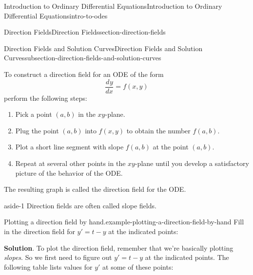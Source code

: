 \documentclass[oneside,10pt,]{book}
\numberwithin{equation}{section}
\newcommand{\dv}[3][]{\dfrac{d^{#1} #2}{d #3^{#1}}}
\begin{document}
\begin{chapterptx}{Introduction to Ordinary Differential Equations}{}{Introduction to Ordinary Differential Equations}{}{}{intro-to-odes}
\begin{sectionptx}{Direction Fields}{}{Direction Fields}{}{}{section-direction-fields}
\begin{subsectionptx}{Direction Fields and Solution Curves}{}{Direction Fields and Solution Curves}{}{}{subsection-direction-fields-and-solution-curves}
\par
\hypertarget{p-39}{}%
To construct a direction field for an ODE of the form%
\begin{equation*}
\dv{y}{x} = f(x,y)
\end{equation*}
perform the following steps:\leavevmode%
\begin{enumerate}
\item\hypertarget{li-5}{}Pick a point \((a,b)\) in the \(xy\)-plane.%
\item\hypertarget{li-6}{}Plug the point \((a,b)\) into \(f(x,y)\) to obtain the number \(f(a,b)\).%
\item\hypertarget{li-7}{}Plot a short line segment with slope \(f(a,b)\) at the point \((a,b)\).%
\item\hypertarget{li-8}{}Repeat at several other points in the \(xy\)-plane until you develop a satisfactory picture of the behavior of the ODE.%
\end{enumerate}
The resulting graph is called the direction field for the ODE.%
\begin{aside}{}{aside-1}%
\hypertarget{p-40}{}%
Direction fields are often called slope fields.%
\end{aside}
\begin{example}{Plotting a direction field by hand.}{example-plotting-a-direction-field-by-hand}%
\hypertarget{p-41}{}%
Fill in the direction field for \(y' = t - y\) at the indicated points:%
\begin{figure}
\centering
{
}
\end{figure}
\par\smallskip%
\noindent\textbf{Solution}.\hypertarget{solution-6}{}\quad%
\hypertarget{p-42}{}%
To plot the direction field, remember that we're basically plotting \emph{slopes}. So we first need to figure out \(y' = t-y\) at the indicated points. The following table lists values for \(y'\) at some of these points: \begin{table}

\end{table}
\end{example}
\end{subsectionptx}
\end{sectionptx}
\end{chapterptx}
\end{document}
